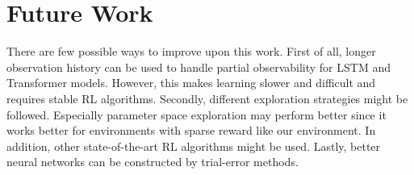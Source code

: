 \section{Future Work}
\label{sec:future_work}

There are few possible ways to improve upon this work. 
First of all, longer observation history can be used to handle partial observability for LSTM and Transformer models. 
However, this makes learning slower and difficult and requires stable RL algorithms. 
Secondly, different exploration strategies might be followed. 
Especially parameter space exploration \cite{plappert_parameter_2018} may perform better since it works better for environments with sparse reward like our environment. 
In addition, other state-of-the-art RL algorithms might be used. 
Lastly, better neural networks can be constructed by trial-error methods. 